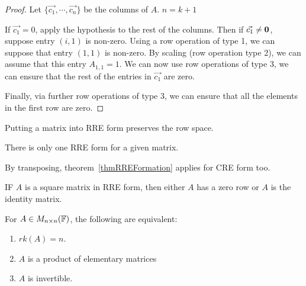 \documentclass[../Main.tex]{subfiles}
\begin{document}
\begin{proof}
    Let $\{\vec{c_1}, \cdots, \vec{c_n}\}$ be the columns of $A$.
    {$n = k+1$}{
        If $\vec{c_1} = 0$, apply the hypothesis to the rest of the columns. Then if $\vec{c_1} \neq \boldsymbol{0}$, suppose entry $(i, 1)$ is non-zero. Using a row operation of type 1, we can suppose that entry $(1, 1)$ is non-zero. By scaling (row operation type 2), we can assume that this entry $A_{1, 1} = 1$.
        We can now use row operations of type 3, we can ensure that the rest of the entries in $\vec{c_1}$ are zero.
        
        Finally, via further row operations of type 3, we can ensure that all the elements in the first row are zero.
    }
\end{proof}
\begin{remarks}
    \item Putting a matrix into RRE form preserves the row space.
    \item There is only one RRE form for a given matrix.
    \item By transposing, theorem~\ref{thmRREFormation} applies for CRE form too.
    \item IF $A$ is a square matrix in RRE form, then either $A$ has a zero row or $A$ is the identity matrix.
\end{remarks}
\begin{theorem}
    For $A \in M_{n \times n}(\mathbb{F})$, the following are equivalent:
    \begin{enumerate}
        \item $rk(A) = n$.
        \item $A$ is a product of elementary matrices
        \item $A$ is invertible.
    \end{enumerate}
    \label{thmInvertibilityCriterion}
\end{theorem}
\end{document}
